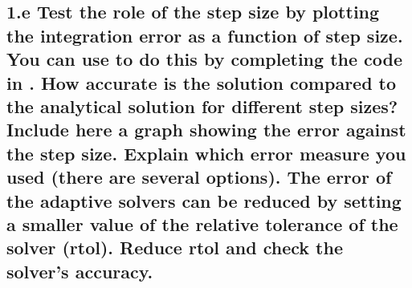 \documentclass{cmc}
\begin{document}


\clearpage

\subsection*{1.e Test the role of the step size by plotting the integration
  error as a function of step size. You can use
  to do this by completing the code in
  . %
  How accurate is the solution compared to the analytical solution for different
  step sizes?  Include here a graph showing the error against the step
  size. Explain which error measure you used (there are several options). The error of
  the adaptive solvers can be reduced by setting a smaller value of the relative
  tolerance of the solver (rtol). Reduce rtol and check the solver's accuracy. }
\end{document}

